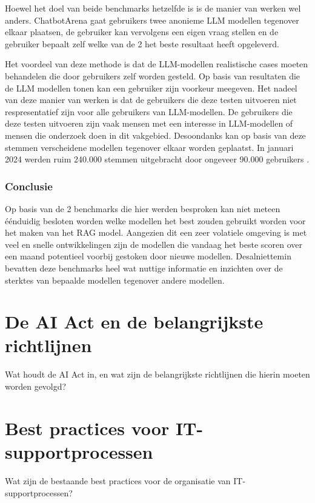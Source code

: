         Hoewel het doel van beide benchmarks hetzelfde is is de manier van werken wel anders. ChatbotArena gaat gebruikers twee anonieme LLM modellen tegenover elkaar plaatsen, de gebruiker kan vervolgens een eigen vraag stellen en de gebruiker bepaalt zelf welke van de 2 het beste resultaat heeft opgeleverd.
        
        Het voordeel van deze methode is dat de LLM-modellen realistische cases moeten behandelen die door gebruikers zelf worden gesteld. Op basis van resultaten die de LLM modellen tonen kan een gebruiker zijn voorkeur meegeven. Het nadeel van deze manier van werken is dat de gebruikers die deze testen uitvoeren niet respresentatief zijn voor alle gebruikers van LLM-modellen. De gebruikers die deze testen uitvoeren zijn vaak mensen met een interesse in LLM-modellen of mensen die onderzoek doen in dit vakgebied. Desoondanks kan op basis van deze stemmen verscheidene modellen tegenover elkaar worden geplaatst. In januari 2024 werden ruim 240.000 stemmen uitgebracht door ongeveer 90.000 gebruikers \autocite{chiang2024chatbot}. 
        
        
        
        \subsubsection{Conclusie}
        
        Op basis van de 2 benchmarks die hier werden besproken kan niet meteen éénduidig besloten worden welke modellen het best zouden gebruikt worden voor het maken van het RAG model. Aangezien dit een zeer volatiele omgeving is met veel en snelle ontwikkelingen zijn de modellen die vandaag het beste scoren over een maand potentieel voorbij gestoken door nieuwe modellen. Desalniettemin bevatten deze benchmarks heel wat nuttige informatie en inzichten over de sterktes van bepaalde modellen tegenover andere modellen. 

\section{De AI Act en de belangrijkste richtlijnen}
Wat houdt de AI Act in, en wat zijn de belangrijkste richtlijnen die hierin moeten worden gevolgd?

\section{Best practices voor IT-supportprocessen}
Wat zijn de bestaande best practices voor de organisatie van IT-supportprocessen?
